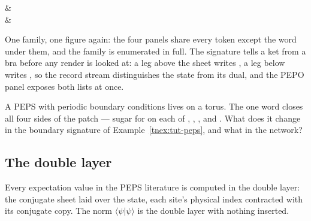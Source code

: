 \begin{tnmultiples}[
  formula={Z,\;\lvert\psi\rangle,\;\langle\psi\rvert,\;O},
  caption={one sheet, four readings},
  index={Left to right: no physical legs, a fully contracted scalar;
    legs up, the state; legs down, its conjugate; legs both ways, the
    PEPS operator.  The quoted signature is the legs-up panel's.},
  signature={kernel-boundary|signature=phys:n, phys:n, phys:n, phys:n},
  variants={{physical=none}{physical=none},
            {physical=up}{physical=up},
            {physical=down}{physical=down},
            {physical=updown}{physical=updown}}]
\begin{tenkz}[lattice={2x2}, frame=plane, variant]
  \tn{} & \tn{} \\
  \tn{} & \tn{}
\end{tenkz}
\end{tnmultiples}

One family, one figure again: the four panels share every token except
the word under them, and the family is enumerated in full.  The
signature tells a ket from a bra before any render is looked at: a leg
above the sheet writes , a leg below writes ,
so the record stream distinguishes the state from its dual, and the PEPO
panel exposes both lists at once.

 A PEPS with periodic boundary conditions lives
on a torus.  The one word  closes all four
sides of the patch --- sugar for  on each of ,
, , and .  What does it change
in the boundary signature of Example~\ref{tnex:tut-peps}, and what in
the network?

\subsection{The double layer}

Every expectation value in the PEPS literature is computed in the double
layer: the conjugate sheet laid over the state, each site's physical
index contracted with its conjugate copy.  The norm
$\langle\psi|\psi\rangle$ is the double layer with nothing inserted.

